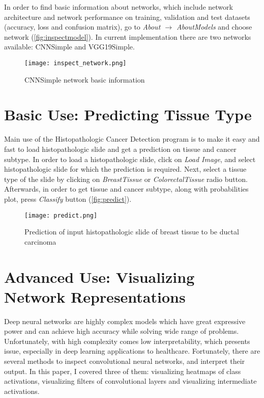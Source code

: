 In order to find basic information about networks, which include network architecture and network performance on training, validation and test datasets (accuracy, loss and confusion matrix), go to \emph{About $\rightarrow$ About\;Models} and choose network (\textcolor{red}{\autoref{fig:inspectmodel}}). In current implementation there are two networks available: CNNSimple and VGG19Simple.
\clearpage

\begin{figure}[h]
	\centering
	\texttt{[image: inspect\_network.png]}
	\caption{CNNSimple network basic information}
	\label{fig:inspectmodel}
\end{figure}

\section{Basic Use: Predicting Tissue Type}
\label{basicuse}

Main use of the Histopathologic Cancer Detection program is to make it easy and fast to load histopathologic slide and get a prediction on tissue and cancer subtype. In order to load a histopathologic slide, click on \emph{Load\; Image}, and select histopathologic slide for which the prediction is required. Next, select a tissue type of the slide by clicking on \emph{Breast\;Tissue} or \emph{Colorectal\;Tissue} radio button. Afterwards, in order to get tissue and cancer subtype, along with probabilities plot, press \emph{Classify} button (\textcolor{red}{\autoref{fig:predict}}).

\begin{figure}[h]
	\centering
	\texttt{[image: predict.png]}
	\caption{Prediction of input histopathologic slide of breast tissue to be ductal carcinoma}
	\label{fig:predict}
\end{figure}

\section{Advanced Use: Visualizing Network Representations}
\label{advuse}

Deep neural networks are highly complex models which have great expressive power and can achieve high accuracy while solving wide range of problems. Unfortunately, with high complexity comes low interpretability, which presents issue, especially in deep learning applications to healthcare. Fortunately, there are several methods to inspect convolutional neural networks, and interpret their output. In this paper, I covered three of them: visualizing heatmaps of class activations, visualizing filters of convolutional layers and visualizing intermediate activations.

